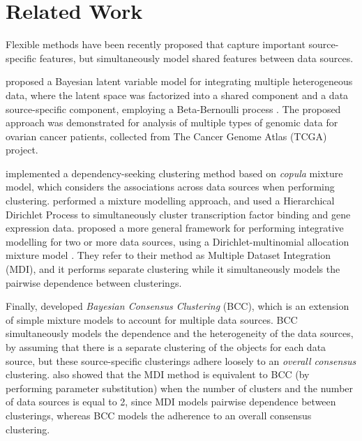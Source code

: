 \section{Related Work} \label{integr-related-work-sect}
Flexible methods have been recently proposed that capture important source-specific features, but simultaneously model shared features between data sources. 

\citet{Ray2012} proposed a Bayesian latent variable model for integrating multiple heterogeneous data, where the latent space was factorized into a shared component and a data source-specific component, employing a Beta-Bernoulli process \citep{Griffiths2005}. The proposed approach was demonstrated for analysis of multiple types of genomic data for ovarian cancer patients, collected from The Cancer Genome Atlas (TCGA) project.

\citet{Rey2012} implemented a dependency-seeking clustering method based on \emph{copula} mixture model, which considers the associations across data sources when performing clustering. \citet{Savage2010} performed a mixture modelling approach, and used a Hierarchical Dirichlet Process \citep{Ferguson1973, Escobar1995} to simultaneously cluster transcription factor binding and gene expression data. \citet{Kirk2012} proposed a more general framework for performing integrative modelling for two or more data sources, using a Dirichlet-multinomial allocation mixture model \citep{Green2001}. They refer to their method as Multiple Dataset Integration (MDI), and it performs separate clustering while it simultaneously models the pairwise dependence between clusterings. 

Finally, \citet{Lock2013} developed \emph{Bayesian Consensus Clustering} (BCC), which is an extension of simple mixture models to account for multiple data sources. BCC simultaneously models the dependence and the heterogeneity of the data sources, by assuming that there is a separate clustering of the objects for each data source, but these source-specific clusterings adhere loosely to an \emph{overall consensus} clustering. \citet{Lock2013} also showed that the MDI method is equivalent to BCC (by performing parameter substitution) when the number of clusters and the number of data sources is equal to 2, since MDI models pairwise dependence between clusterings, whereas BCC models the adherence to an overall consensus clustering.